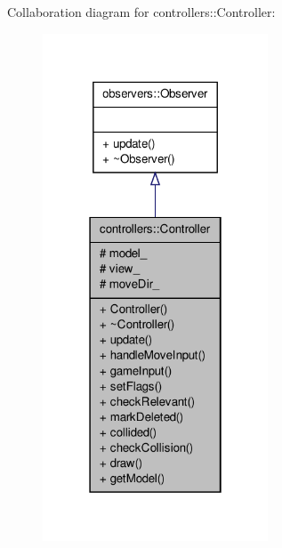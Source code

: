 \-Collaboration diagram for controllers\-:\-:\-Controller\-:\nopagebreak
\begin{figure}[H]
\begin{center}
\leavevmode
\includegraphics[width=190pt]{d2/dde/classcontrollers_1_1Controller__coll__graph}
\end{center}
\end{figure}
